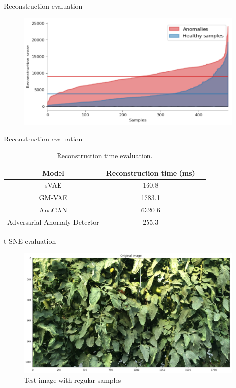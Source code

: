 \documentclass[15pt]{beamer} %
\begin{document}
\begin{frame}{Reconstruction evaluation}
 \begin{figure}
   \centering
   \includegraphics[width=.85\textwidth]{rec_anogan_eval}
  \end{figure}
\end{frame}

\begin{frame}{Reconstruction evaluation}
 \begin{table}[htb]
    \caption[Reconstruction time evaluation]{Reconstruction time evaluation.}
    \label{table:rec_time}
    \centering
    \begin{tabular}{ c c c }
        \hline
        Model & Reconstruction time (ms) \\
        \hline
        sVAE & 160.8 \\
        GM-VAE & 1383.1 \\
        AnoGAN & 6320.6 \\
        Adversarial Anomaly Detector & 255.3 \\
        \hline
    \end{tabular}
\end{table}
\end{frame}

\begin{frame}{t-SNE evaluation}
 \begin{figure}
  \centering
  \includegraphics[width=.85\textwidth]{anogan_test_image1}
  \caption{Test image with regular samples}
 \end{figure}
\end{frame}
\end{document}
